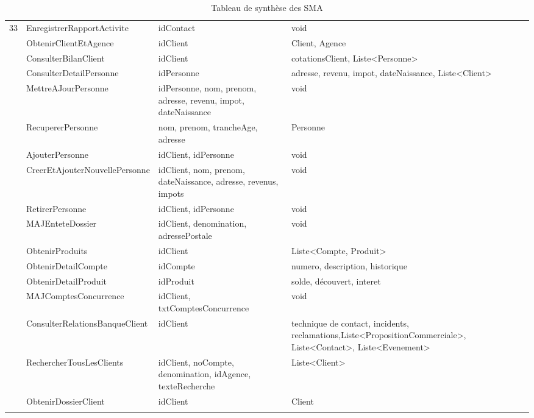 \begin{table}[H]
{\begin{tabular}{P{0.8cm}P{5.5cm}P{6cm}P{6cm}}
			33 & EnregistrerRapportActivite & idContact &  void \\  & ObtenirClientEtAgence & idClient &  Client, Agence \\  & ConsulterBilanClient & idClient &  cotationsClient, Liste<Personne> \\  & ConsulterDetailPersonne & idPersonne &  adresse, revenu, impot, dateNaissance, Liste<Client> \\  & MettreAJourPersonne & idPersonne, nom, prenom, adresse, revenu, impot, dateNaissance &  void \\  & RecupererPersonne & nom, prenom, trancheAge, adresse &  Personne \\  & AjouterPersonne & idClient, idPersonne &  void \\  & CreerEtAjouterNouvellePersonne & idClient, nom, prenom, dateNaissance, adresse, revenus, impots &  void \\  & RetirerPersonne & idClient, idPersonne &  void \\  & MAJEnteteDossier & idClient, denomination, adressePostale &  void \\  & ObtenirProduits & idClient &  Liste<Compte, Produit> \\  & ObtenirDetailCompte & idCompte &  numero, description, historique \\  & ObtenirDetailProduit & idProduit &  solde, découvert, interet \\  & MAJComptesConcurrence & idClient, txtComptesConcurrence &  void \\  & ConsulterRelationsBanqueClient & idClient &  technique de contact, incidents, reclamations,Liste<PropositionCommerciale>, Liste<Contact>, Liste<Evenement> \\  & RechercherTousLesClients & idClient, noCompte, denomination, idAgence, texteRecherche &  Liste<Client> \\  & ObtenirDossierClient & idClient &  Client \\ \hline
{}\hline
		\end{tabular}
	}
	\caption{Tableau de synthèse des SMA}
\end{table}

